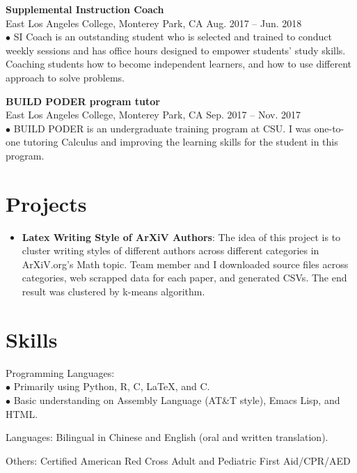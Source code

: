 \documentclass[letterpaper,11pt]{article}
\newcommand{\resumeItem}[2]{
  \item\small{
    \textbf{#1}{: #2 \vspace{-2pt}}
  }
}
\newcommand{\resumeSubItem}[2]{\resumeItem{#1}{#2}\vspace{-4pt}}
\newcommand{\resumeSubHeadingListStart}{\begin{itemize}[leftmargin=*]}
\newcommand{\resumeSubHeadingListEnd}{\end{itemize}}
\newcommand{\CC}{C\nolinebreak\hspace{-.05em}\raisebox{.4ex}{\tiny\bf +}\nolinebreak\hspace{-.10em}\raisebox{.4ex}{\tiny\bf +}}
\def\CC{{C\nolinebreak[4]\hspace{-.05em}\raisebox{.4ex}{\tiny\bf ++}}}
\begin{document}
\textbf{Supplemental Instruction Coach}\\
East Los Angeles College, Monterey Park, CA \hfill Aug. 2017 – Jun. 2018 \\
$\bullet$ SI Coach is an outstanding student who is selected and trained to conduct weekly sessions and has office hours designed to empower students' study skills. Coaching students how to become independent learners, and how to use different approach to solve problems. \break

\textbf{BUILD PODER program tutor}\\
East Los Angeles College, Monterey Park, CA \hfill Sep. 2017 – Nov. 2017 \\
$\bullet$ BUILD PODER is an undergraduate training program at CSU. I was one-to-one tutoring Calculus and improving the learning skills for the student in this program.\break


\section{Projects}
\resumeSubHeadingListStart
\resumeSubItem{Latex Writing Style of ArXiV Authors}
{The idea of this project is to cluster writing styles of different authors across different categories in ArXiV.org's Math topic. Team member and I downloaded source files across categories, web scrapped data for each paper, and generated CSVs. The end result was clustered by k-means algorithm.}\\

\resumeSubHeadingListEnd


\section{Skills}
Programming Languages: \\
$\bullet$ Primarily using Python, R, \CC, \LaTeX, and C. \\
$\bullet$ Basic understanding on Assembly Language (AT\&T style), Emacs Lisp, and HTML. \break

Languages: Bilingual in Chinese and English (oral and written translation). \break

Others:
Certified American Red Cross Adult and Pediatric First Aid/CPR/AED

\end{document}
